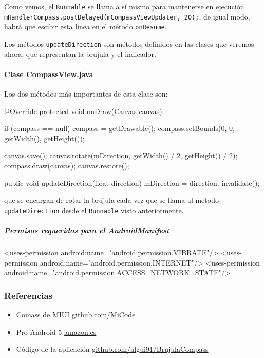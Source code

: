\documentclass[	DIV=calc,%
							paper=a4,%
							fontsize=11pt]{scrartcl}	 					%
\begin{document}
Como vemos, el \texttt{Runnable} se llama a sí mismo para mantenerse en
ejecución
\texttt{mHandlerCompass.postDelayed(mCompassViewUpdater, 20);}, de igual
modo, habrá que escibir esta línea en el método \texttt{onResume}.

Los métodos \texttt{updateDirection} son métodos definidos en las clases
que veremos ahora, que representan la brujula y el indicador.

\paragraph{Clase CompassView.java}\label{clase-compassview.java}

Los dos métodos más importantes de esta clase son:

\begin{javacode}
	@Override
	protected void onDraw(Canvas canvas) {
			if (compass == null) {
					compass = getDrawable();
					compass.setBounds(0, 0, getWidth(), getHeight());
			}

			canvas.save();
			canvas.rotate(mDirection, getWidth() / 2, getHeight() / 2);
			compass.draw(canvas);
			canvas.restore();
	}

	public void updateDirection(float direction) {
			mDirection = direction;
			invalidate();
	}
\end{javacode}

que se encargan de rotar la brújula cada vez que se llama al método
\texttt{updateDirection} desde el \texttt{Runnable} visto anteriormente.

\subparagraph{Permisos requeridos para el
AndroidManifest}\label{permisos-requeridos-para-el-androidmanifest}

\begin{xmlcode}
	<uses-permission android:name="android.permission.VIBRATE"/>
	<uses-permission android:name="android.permission.INTERNET"/>
	<uses-permission android:name="android.permission.ACCESS_NETWORK_STATE"/>
\end{xmlcode}

\subsubsection{Referencias}\label{referencias}

\begin{itemize}
\itemsep1pt\parskip0pt
\item
  Comass de MIUI \textbar{}
  \href{https://github.com/MiCode/Compass}{github.com/MiCode}
\item
  Pro Android 5 \textbar{}
  \href{http://www.amazon.es/gp/product/1430246804/ref=as_li_ss_tl?ie=UTF8\&camp=3626\&creative=24822\&creativeASIN=1430246804\&linkCode=as2\&tag=bmab-21}{amazon.es}
\item
  Código de la aplicación \textbar{}
  \href{https://github.com/algui91/grado_informatica_npi/tree/master/Android/BrujulaCompass}{github.com/algui91/BrujulaCompass}
\end{itemize}
\end{document}
